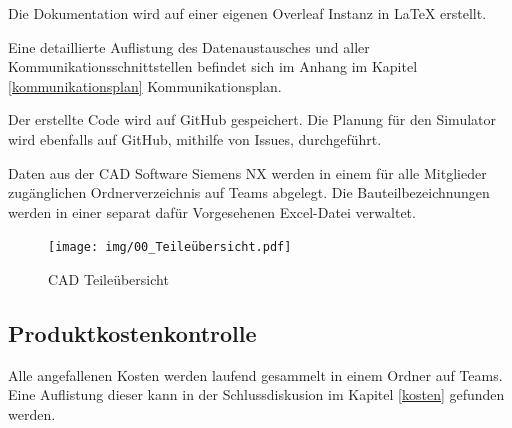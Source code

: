 Die Dokumentation wird auf einer eigenen Overleaf Instanz in LaTeX erstellt.

Eine detaillierte Auflistung des Datenaustausches und aller Kommunikationsschnittstellen befindet sich im Anhang im Kapitel \ref{kommunikationsplan} Kommunikationsplan.

Der erstellte Code wird auf GitHub gespeichert. Die Planung für den Simulator wird ebenfalls auf GitHub, mithilfe von Issues, durchgeführt. 

Daten aus der CAD Software Siemens NX werden in einem für alle Mitglieder zugänglichen Ordnerverzeichnis auf Teams abgelegt. Die Bauteilbezeichnungen werden in einer separat dafür Vorgesehenen Excel-Datei verwaltet. 

\begin{figure}[H]
\centering
\texttt{[image: img/00\_Teileübersicht.pdf]}
\caption{CAD Teileübersicht}
\label{CAD-Teileuebersicht}
\end{figure}


\subsection{Produktkostenkontrolle}

Alle angefallenen Kosten werden laufend gesammelt in einem Ordner auf Teams. Eine Auflistung dieser kann in der Schlussdiskusion im Kapitel \ref{kosten} gefunden werden.

